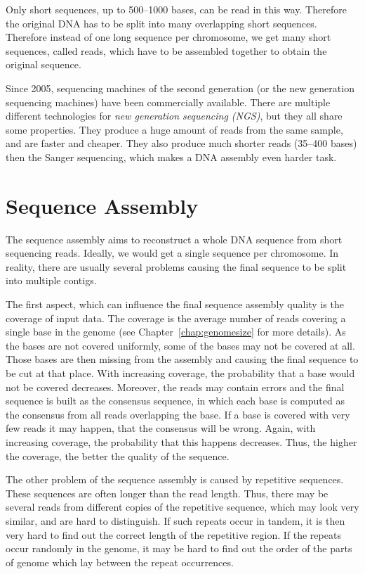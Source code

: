 Only short sequences, up to 500--1000 bases, can be read in this way. Therefore the original DNA has to be split into many overlapping short sequences.
Therefore instead of one long sequence per chromosome, we get many short sequences, called reads, which have to be assembled together to obtain the original sequence.

Since 2005, sequencing machines of the second generation (or the new generation sequencing machines) have been commercially available. There are multiple different technologies for \emph{new generation sequencing (NGS)}, but they all share some properties.
They produce a huge amount of reads from the same sample, and are faster and cheaper. They also produce much shorter reads (35--400 bases) then the Sanger sequencing, which makes a DNA assembly even harder task.


\section{Sequence Assembly}
\label{sect:dna-assembly}

The sequence assembly aims to reconstruct a whole DNA sequence from short sequencing reads. Ideally, we would get a single sequence per chromosome. In reality, there are usually several problems causing the final sequence to be split into multiple contigs.

The first aspect, which can influence the final sequence assembly quality is the coverage of input data. The coverage is the average number of reads covering a single base in the genome (see Chapter~\ref{chap:genomesize} for more details).
As the bases are not covered uniformly, some of the bases may not be covered at all. Those bases are then missing from the assembly and causing the final sequence to be cut at that place. With increasing coverage, the probability that a base would not be covered decreases.
Moreover, the reads may contain errors and the final sequence is built as the consensus sequence, in which each base is computed as the consensus from all reads overlapping the base. If a base is covered with very few reads it may happen, that the consensus will be wrong. Again, with increasing coverage, the probability that this happens decreases. Thus, the higher the coverage, the better the quality of the sequence.

The other problem of the sequence assembly is caused by repetitive sequences. These sequences are often longer than the read length. Thus, there may be several reads from different copies of the repetitive sequence, which may look very similar, and are hard to distinguish. If such repeats occur in tandem, it is then very hard to find out the correct length of the repetitive region. If the repeats occur randomly in the genome, it may be hard to find out the order of the parts of genome which lay between the repeat occurrences.

